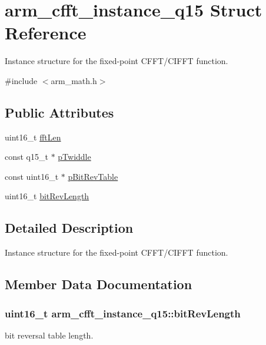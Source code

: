 \hypertarget{structarm__cfft__instance__q15}{}\section{arm\+\_\+cfft\+\_\+instance\+\_\+q15 Struct Reference}
\label{structarm__cfft__instance__q15}


Instance structure for the fixed-\/point C\+F\+F\+T/\+C\+I\+F\+FT function.  




{\ttfamily \#include $<$arm\+\_\+math.\+h$>$}

\subsection*{Public Attributes}
\begin{DoxyCompactItemize}
\item 
uint16\+\_\+t \hyperlink{structarm__cfft__instance__q15_a5f9e1d3a8c127ee323b5e6929aeb90df}{fft\+Len}
\item 
const q15\+\_\+t $\ast$ \hyperlink{structarm__cfft__instance__q15_afdaf12ce4687cec021c5ae73d0987a3f}{p\+Twiddle}
\item 
const uint16\+\_\+t $\ast$ \hyperlink{structarm__cfft__instance__q15_ac9160b80243b99a0b6e2f75ddb5cf0ae}{p\+Bit\+Rev\+Table}
\item 
uint16\+\_\+t \hyperlink{structarm__cfft__instance__q15_a738907cf34bdbbaf724414ac2decbc3c}{bit\+Rev\+Length}
\end{DoxyCompactItemize}


\subsection{Detailed Description}
Instance structure for the fixed-\/point C\+F\+F\+T/\+C\+I\+F\+FT function. 

\subsection{Member Data Documentation}
\subsubsection[{\texorpdfstring{bit\+Rev\+Length}{bitRevLength}}]{\setlength{\rightskip}{0pt plus 5cm}uint16\+\_\+t arm\+\_\+cfft\+\_\+instance\+\_\+q15\+::bit\+Rev\+Length}\hypertarget{structarm__cfft__instance__q15_a738907cf34bdbbaf724414ac2decbc3c}{}\label{structarm__cfft__instance__q15_a738907cf34bdbbaf724414ac2decbc3c}
bit reversal table length. 
